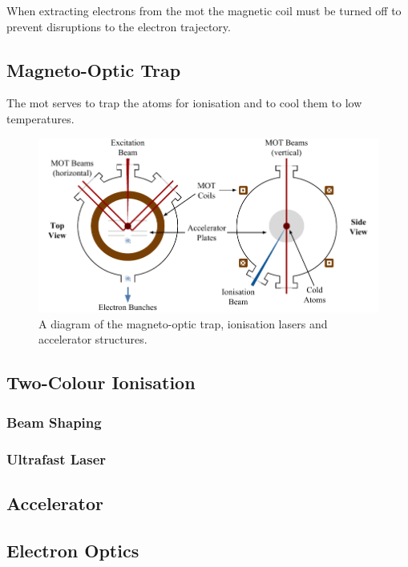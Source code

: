 When extracting electrons from the \gls{mot} the magnetic coil must be turned off to prevent disruptions to the electron trajectory.

\subsection{Magneto-Optic Trap}
The \gls{mot} serves to trap the atoms for ionisation and to cool them to low temperatures.

\begin{figure}
    \center
    \includegraphics[width=145mm]{part2/Figs/MOTdiagram.pdf}
    \caption{A diagram of the magneto-optic trap, ionisation lasers and accelerator structures.}
    \label{figure:mot}
\end{figure}

\subsection{Two-Colour Ionisation}

\subsubsection{Beam Shaping}

\subsubsection{Ultrafast Laser}

\subsection{Accelerator}

\subsection{Electron Optics}

